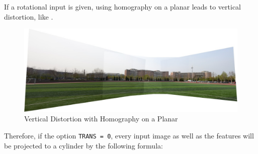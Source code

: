\begin{enumerate}
    If a rotational input is given, using homography on a planar leads to vertical distortion, like .
    \begin{figure}[H]
      \centering
      \includegraphics[width=\textwidth]{res/distort.png}
      \caption{Vertical Distortion with Homography on a Planar\label{fig:distort}}
    \end{figure}

    Therefore, if the option \verb|TRANS = 0|,
    every input image as well as the features will be projected to a cylinder by the following formula:


\end{enumerate}
